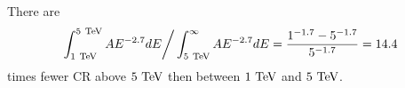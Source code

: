 \subsection{}
There are
\begin{equation}
  \int_{1~\text{TeV}}^{5~\text{TeV}} A E^{-2.7} dE \bigg/ \int_{5~\text{TeV}}^{\infty} A E^{-2.7} dE
  = \frac{1^{-1.7}-5^{-1.7}}{5^{-1.7}}
  = 14.4
\end{equation}
times fewer CR above $5~\text{TeV}$ then between $1~\text{TeV}$ and $5~\text{TeV}$.

